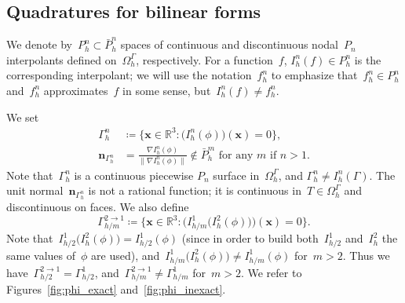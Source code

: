\documentclass[12pt]{article}
\newcommand{\vect}[1]{\boldsymbol{\mathbf{#1}}}
\begin{document}
\subsection{Quadratures for bilinear forms}

We denote by~$P_h^n \subset \bar P_h^n$ spaces of continuous and discontinuous nodal~$P_n$ interpolants defined on~$\Omega_h^\Gamma$, respectively. For a function~$f$, $I_h^n(f) \in P_h^n$ is the corresponding interpolant; we will use the notation~$f_h^n$ to emphasize that~$f_h^n \in P_h^n$ and~$f_h^n$ approximates~$f$ in some sense, but~$I_h^n(f) \ne f_h^n$.

We set
\begin{align}\label{gammah}
	\Gamma_h^n &\coloneqq \{ \vect x \in \mathbb{R}^3 : \big(I_h^n(\phi)\big)(\vect x) = 0 \}, \\
	\vect n_{\Gamma_h^n} &= \frac{\nabla I_h^n(\phi)}{\|\nabla I_h^n(\phi)\|} \not\in \bar{P}_h^m\text{ for any $m$ if $n > 1$}. \label{gammah:n}
\end{align}  
	Note that~$\Gamma_h^n$ is a continuous piecewise $P_n$ surface in~$\Omega_h^\Gamma$, and $\Gamma_h^n \ne I_h^n(\Gamma)$. The unit normal~$\vect n_{\Gamma_h^n}$ is not a rational function; it is continuous in~$T \in \Omega_h^\Gamma$ and discontinuous on faces. We also define
\begin{equation}\label{gammah2}
	\Gamma_{h/m}^{2 \rightarrow 1} \coloneqq \{ \vect x \in \mathbb{R}^3 : \Big(I_{h/m}^1\big(I_h^2(\phi)\big)\Big)(\vect x) = 0 \}.
\end{equation}  
Note that~$I_{h/2}^1\big(I_{h}^2(\phi)\big) = I_{h/2}^1(\phi)$ (since in order to build both~$I_{h/2}^1$ and~$I_{h}^2$ the same values of~$\phi$ are used), and~$I_{h/m}^1\big(I_{h}^2(\phi)\big) \ne I_{h/m}^1(\phi)$ for~$m > 2$. Thus we have~$\Gamma_{h/2}^{2 \rightarrow 1} = \Gamma_{h/2}^1$, and~$\Gamma_{h/m}^{2 \rightarrow 1} \ne \Gamma_{h/m}^1$ for~$m > 2$. We refer to Figures~\ref{fig:phi_exact} and~\ref{fig:phi_inexact}. 
\end{document}
